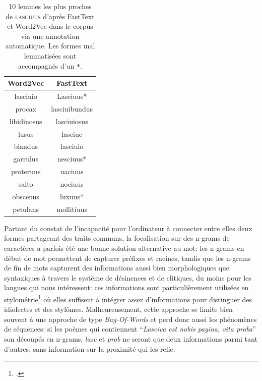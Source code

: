 \begin{table}[ht]
    \centering
    \begin{tabular}{c|c}
        Word2Vec    &  FastText      \\ \hline
        lasciuio    &  Lasciuus*      \\
        procax      &  lasciuibundus \\
        libidinosus &  lasciuiosus   \\
        lusus       &  lasciue       \\
        blandus     &  lasciuio      \\
        garrulus    &  nesciuus*      \\
        proteruus   &  uaciuus       \\ %
        salto       &  nociuus       \\
        obscenus    &  luxuus*        \\
        petulans    &  mollitiuus    \\ %
    \end{tabular}
    \caption{10 lemmes les plus proches de \textsc{lasciuus} d'après FastText et Word2Vec dans le corpus via une annotation automatique. Les formes mal lemmatisées sont accompagnés d'un \texttt{*}.}
    \label{tab:fasttext:lemmes}
\end{table}


Partant du constat de l'incapacité pour l'ordinateur à connecter entre elles deux formes partageant des traits communs, la focalisation sur des n-grams de caractères a parfois été une bonne solution alternative au mot: les n-grams en début de mot permettent de capturer préfixes et racines, tandis que les n-grams de fin de mots capturent des informations aussi bien morphologiques que syntaxiques à travers le système de désinences et de clitiques, du moins pour les langues qui nous intéressent: ces informations sont particulièrement utilisées en stylométrie\footcite{kestemont_authenticating_2016, camps_stylometry_2020} où elles suffisent à intégrer assez d'informations pour distinguer des idiolectes et des stylômes. Malheureusement, cette approche se limite bien souvent à une approche de type \textit{Bag-Of-Words} et perd donc aussi les phénomènes de séquences: si les poèmes qui contiennent \enquote{\textit{Lasciva est nobis pagina, vita proba}} son découpés en n-grams, \textit{lasc} et \textit{prob} ne seront que deux informations parmi tant d'autres, sans information sur la proximité qui les relie.

